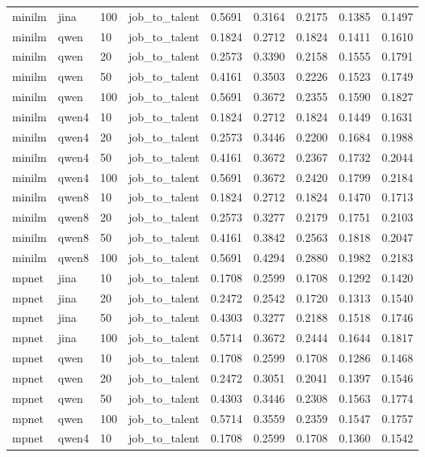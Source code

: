 \begin{table}[t]
\begin{tabular}{lllllllll}
minilm & jina & 100 & job_to_talent & 0.5691 & 0.3164 & 0.2175 & 0.1385 & 0.1497 \\
minilm & qwen & 10 & job_to_talent & 0.1824 & 0.2712 & 0.1824 & 0.1411 & 0.1610 \\
minilm & qwen & 20 & job_to_talent & 0.2573 & 0.3390 & 0.2158 & 0.1555 & 0.1791 \\
minilm & qwen & 50 & job_to_talent & 0.4161 & 0.3503 & 0.2226 & 0.1523 & 0.1749 \\
minilm & qwen & 100 & job_to_talent & 0.5691 & 0.3672 & 0.2355 & 0.1590 & 0.1827 \\
minilm & qwen4 & 10 & job_to_talent & 0.1824 & 0.2712 & 0.1824 & 0.1449 & 0.1631 \\
minilm & qwen4 & 20 & job_to_talent & 0.2573 & 0.3446 & 0.2200 & 0.1684 & 0.1988 \\
minilm & qwen4 & 50 & job_to_talent & 0.4161 & 0.3672 & 0.2367 & 0.1732 & 0.2044 \\
minilm & qwen4 & 100 & job_to_talent & 0.5691 & 0.3672 & 0.2420 & 0.1799 & 0.2184 \\
minilm & qwen8 & 10 & job_to_talent & 0.1824 & 0.2712 & 0.1824 & 0.1470 & 0.1713 \\
minilm & qwen8 & 20 & job_to_talent & 0.2573 & 0.3277 & 0.2179 & 0.1751 & 0.2103 \\
minilm & qwen8 & 50 & job_to_talent & 0.4161 & 0.3842 & 0.2563 & 0.1818 & 0.2047 \\
minilm & qwen8 & 100 & job_to_talent & 0.5691 & 0.4294 & 0.2880 & 0.1982 & 0.2183 \\
mpnet & jina & 10 & job_to_talent & 0.1708 & 0.2599 & 0.1708 & 0.1292 & 0.1420 \\
mpnet & jina & 20 & job_to_talent & 0.2472 & 0.2542 & 0.1720 & 0.1313 & 0.1540 \\
mpnet & jina & 50 & job_to_talent & 0.4303 & 0.3277 & 0.2188 & 0.1518 & 0.1746 \\
mpnet & jina & 100 & job_to_talent & 0.5714 & 0.3672 & 0.2444 & 0.1644 & 0.1817 \\
mpnet & qwen & 10 & job_to_talent & 0.1708 & 0.2599 & 0.1708 & 0.1286 & 0.1468 \\
mpnet & qwen & 20 & job_to_talent & 0.2472 & 0.3051 & 0.2041 & 0.1397 & 0.1546 \\
mpnet & qwen & 50 & job_to_talent & 0.4303 & 0.3446 & 0.2308 & 0.1563 & 0.1774 \\
mpnet & qwen & 100 & job_to_talent & 0.5714 & 0.3559 & 0.2359 & 0.1547 & 0.1757 \\
mpnet & qwen4 & 10 & job_to_talent & 0.1708 & 0.2599 & 0.1708 & 0.1360 & 0.1542 \\

\end{tabular}
\end{table}
